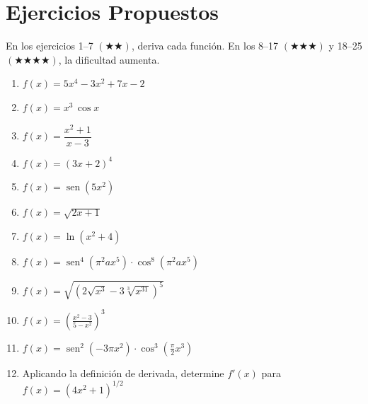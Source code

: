 \documentclass[12pt, letterpaper]{article}
\begin{document}
\newpage
\section{Ejercicios Propuestos}

\noindent En los ejercicios 1--7 $(\bigstar\bigstar)$, deriva cada función. En los 8--17 $(\bigstar\bigstar\bigstar)$ y 18--25 $(\bigstar\bigstar\bigstar\bigstar)$, la dificultad aumenta.

\begin{enumerate}[leftmargin=*]

  \item \medio{} $f(x) = 5x^4 - 3x^2 + 7x - 2$

  \item \medio{} $f(x) = x^3\,\cos x$

  \item \medio{} $f(x) = \dfrac{x^2 + 1}{x - 3}$

  \item \medio{} $f(x) = (3x + 2)^4$

  \item \medio{} $f(x) = \operatorname{sen}(5x^2)$

  \item \medio{} $f(x) = \sqrt{2x + 1}$

  \item \medio{} $f(x) = \ln(x^2 + 4)$

  \item \dificil{} $f(x) = \operatorname{sen}^4(\pi^2 a x^5)\cdot\cos^8(\pi^2 a x^5)$ %

  \item \dificil{} $f(x) = \sqrt{\left(2\sqrt{x^3} - 3\sqrt[3]{x^{31}}\right)^5}$ %

  \item \dificil{} $f(x) = \left(\frac{x^2 - 3}{5 - x^2}\right)^3$ %

  \item \dificil{} $f(x) = \operatorname{sen}^2(-3\pi x^2)\cdot\cos^3\left(\frac{\pi}{2}x^3\right)$ %

  \item \dificil{} Aplicando la definición de derivada, determine $f'(x)$ para $f(x) = (4x^2 + 1)^{1/2}$ %


\end{enumerate}
\end{document}
